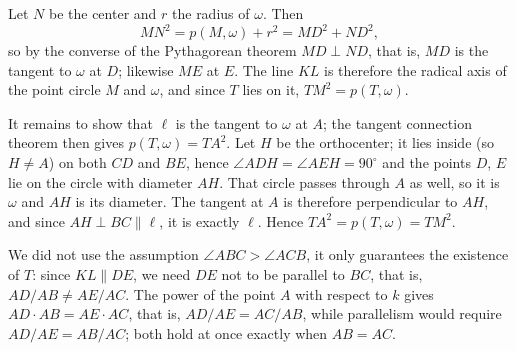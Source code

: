 {    Let $N$ be the center and $r$ the radius of $\omega$. Then
    $$
    MN^2 = p(M,\omega) + r^2 = MD^2 + ND^2,
    $$
    so by the converse of the Pythagorean theorem $MD \perp ND$, that is, $MD$ is the tangent to $\omega$ at $D$; likewise $ME$ at $E$. The line $KL$ is therefore the radical axis of the point circle $M$ and $\omega$, and since $T$ lies on it, $TM^2 = p(T,\omega)$.

    It remains to show that $\ell$ is the tangent to $\omega$ at $A$; the tangent connection theorem then gives $p(T,\omega) = TA^2$. Let $H$ be the orthocenter; it lies inside (so $H \neq A$) on both $CD$ and $BE$, hence $\angle ADH = \angle AEH = 90^\circ$ and the points $D$, $E$ lie on the circle with diameter $AH$. That circle passes through $A$ as well, so it is $\omega$ and $AH$ is its diameter. The tangent at $A$ is therefore perpendicular to $AH$, and since $AH \perp BC \parallel \ell$, it is exactly $\ell$. Hence $TA^2 = p(T,\omega) = TM^2$.

    We did not use the assumption $\angle ABC > \angle ACB$, it only guarantees the existence of $T$: since $KL \parallel DE$, we need $DE$ not to be parallel to $BC$, that is, $AD/AB \neq AE/AC$. The power of the point $A$ with respect to $k$ gives $AD \cdot AB = AE \cdot AC$, that is, $AD/AE = AC/AB$, while parallelism would require $AD/AE = AB/AC$; both hold at once exactly when $AB = AC$.
}

